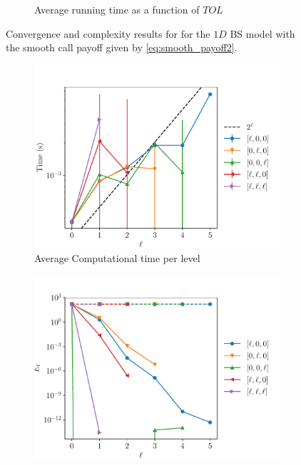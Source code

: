 \documentclass[11pt]{article}
\begin{document}
\begin{figure}[!h]
\begin{subfigure}{.5\textwidth}
		\caption{Average running time as a function of $TOL$}
		\label{fig:misc_1D_BS_2_steps_smooth_second_payoff_eps_10_5_sub2}
	\end{subfigure}%
	\caption{Convergence and complexity results for for the $1D$ BS model with the smooth call payoff given by \eqref{eq:smooth_payoff2}.}
	\label{fig:misc_1D_BS_2_steps_smooth_second_payoff_eps_10_5_1}
\end{figure}



\begin{figure}[!h]
	\centering
	\begin{subfigure}{.5\textwidth}
		\centering
		\includegraphics[width=0.95\linewidth]{./figures/1D_BS_2_steps_smooth_second_payoff_eps_10_5/level_work.pdf}
		\caption{Average Computational time per level}
		\label{fig:misc_1D_BS_2_steps_smooth_second_payoff_eps_10_5_sub3}
	\end{subfigure}%
	\begin{subfigure}{.5\textwidth}
		\centering
		\includegraphics[width=0.95\linewidth]{./figures/1D_BS_2_steps_smooth_second_payoff_eps_10_5/levels_error_rate.pdf}

\end{subfigure}
\end{figure}
\end{document}
